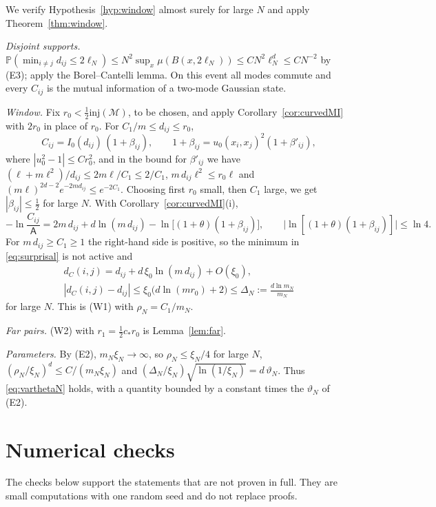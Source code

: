 \documentclass[11pt,a4paper]{article}
\makeatletter
\theoremstyle{stmt}
\theoremstyle{defn}
\theoremstyle{rmk}
\renewenvironment{proof}[1][\proofname]{\par\pushQED{\qed}\normalfont\topsep6\p@\@plus6\p@\relax
  \trivlist\item[\hskip\labelsep{\sffamily\itshape\small #1.}]\ignorespaces}{\popQED\endtrivlist\@endpefalse}
\numberwithin{equation}{section}
\newcommand{\M}{\mathcal{M}}
\makeatother
\begin{document}
\begin{proof}[Proof of Theorem~\ref{thm:e2e}]
We verify Hypothesis~\ref{hyp:window} almost surely for large $N$ and apply Theorem~\ref{thm:window}.

\emph{Disjoint supports.} $\mathbb P(\min_{i\ne j}d_{ij}\le2\ell_N)\le N^2\sup_x\mu(B(x,2\ell_N))\le CN^2\ell_N^d\le CN^{-2}$ by (E3); apply the Borel--Cantelli lemma. On this event all modes commute and every $C_{ij}$ is the mutual information of a two-mode Gaussian state.

\emph{Window.} Fix $r_0<\tfrac12\mathrm{inj}(\M)$, to be chosen, and apply Corollary~\ref{cor:curvedMI} with $2r_0$ in place of $r_0$. For $C_1/m\le d_{ij}\le r_0$,
\[
C_{ij}=I_0(d_{ij})\,(1+\beta_{ij}),\qquad1+\beta_{ij}=u_0(x_i,x_j)^2(1+\beta'_{ij}),
\]
where $|u_0^2-1|\le Cr_0^2$, and in the bound for $\beta'_{ij}$ we have $(\ell+m\ell^2)/d_{ij}\le2m\ell/C_1\le2/C_1$, $m\,d_{ij}\ell^2\le r_0\ell$ and $(m\ell)^{2d-2}e^{-2md_{ij}}\le e^{-2C_1}$. Choosing first $r_0$ small, then $C_1$ large, we get $|\beta_{ij}|\le\tfrac12$ for large $N$. With Corollary~\ref{cor:curvedMI}(i),
\[
-\ln\frac{C_{ij}}{\mathsf A}=2m\,d_{ij}+d\ln(m\,d_{ij})-\ln\big[(1+\theta)(1+\beta_{ij})\big],\qquad\big|\ln[(1+\theta)(1+\beta_{ij})]\big|\le\ln4 .
\]
For $m\,d_{ij}\ge C_1\ge1$ the right-hand side is positive, so the minimum in \eqref{eq:surprisal} is not active and
\begin{gather*}
d_C(i,j)=d_{ij}+d\,\xi_0\ln(m\,d_{ij})+O(\xi_0),\\
|d_C(i,j)-d_{ij}|\le\xi_0\big(d\ln(mr_0)+2\big)\le\Delta_N:=\frac{d\ln m_N}{m_N}
\end{gather*}
for large $N$. This is (W1) with $\rho_N=C_1/m_N$.

\emph{Far pairs.} (W2) with $r_1=\tfrac12c_*r_0$ is Lemma~\ref{lem:far}.

\emph{Parameters.} By (E2), $m_N\xi_N\to\infty$, so $\rho_N\le\xi_N/4$ for large $N$, $(\rho_N/\xi_N)^d\le C/(m_N\xi_N)$ and $(\Delta_N/\xi_N)\sqrt{\ln(1/\xi_N)}=d\,\vartheta_N$. Thus \eqref{eq:varthetaN} holds, with a quantity bounded by a constant times the $\vartheta_N$ of (E2).
\end{proof}

\section{Numerical checks}\label{app:num}

The checks below support the statements that are not proven in full. They are small computations with one random seed and do not replace proofs.
\end{document}
